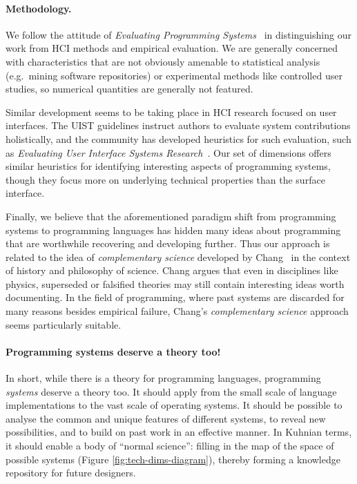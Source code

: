 \documentclass[english,submission]{programming}
\providecommand{\DIFadd}[1]{{\protect\color{blue}\uwave{#1}}} %
\providecommand{\DIFaddbegin}{} %
\providecommand{\DIFaddend}{} %
\begin{document}
\paragraph{Methodology.}

We follow the attitude of \emph{Evaluating Programming
Systems}~\cite{EvProgSys} in distinguishing our work from HCI methods
and empirical evaluation. We are generally concerned with
characteristics that are not obviously amenable to statistical analysis
(e.g.~mining software repositories) or experimental methods like
controlled user studies, so numerical quantities are generally not
featured.

Similar development seems to be taking place in HCI research focused on
user interfaces. The UIST guidelines\DIFaddbegin \DIFadd{~}\DIFaddend \cite{UISTAuthor} instruct authors
to evaluate system contributions holistically, and the community has
developed heuristics for such evaluation, such as \emph{Evaluating User
Interface Systems Research}~\cite{EvUISR}. Our set of dimensions offers
similar heuristics for identifying interesting aspects of programming
systems, though they focus more on underlying technical properties than
the surface interface.

Finally, we believe that the aforementioned paradigm shift from
programming systems to programming languages has hidden many ideas about
programming that are worthwhile recovering and developing
further\DIFaddbegin \DIFadd{~}\DIFaddend \cite{ComplementaryBasic}. Thus our approach is related to the
idea of \emph{complementary science} developed by Chang~\cite{Chang} in
the context of history and philosophy of science. Chang argues that even
in disciplines like physics, superseded or falsified theories may still
contain interesting ideas worth documenting. In the field of
programming, where past systems are discarded for many reasons besides
empirical failure, Chang's \emph{complementary science} approach seems
particularly suitable.

\paragraph{Programming systems deserve a theory too!}

In short, while there is a theory for programming languages, programming
\emph{systems} deserve a theory too. It should apply from the small
scale of language implementations to the vast scale of operating
systems. It should be possible to analyse the common and unique features
of different systems, to reveal new possibilities, and to build on past
work in an effective manner. In Kuhnian terms\DIFaddbegin \DIFadd{~\mbox{%
\cite{Kuhn}}\hspace{0pt}%
}\DIFaddend , it should
enable a body of ``normal science'': filling in the map of the space of
possible systems (Figure \ref{fig:tech-dims-diagram}), thereby forming a
knowledge repository for future designers.
\end{document}
